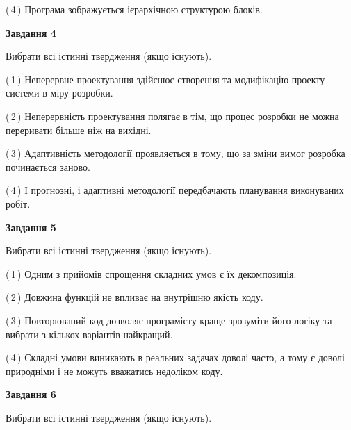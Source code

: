\documentclass[10pt, ukrainian]{article}
\begin{document}
{\begin {large}
(\,4\,) Програма зображується ієрархічною структурою блоків.%


{\begin {center}\textbf{Завдання 4}\end {center}}\par
Вибрати всі істинні твердження (якщо існують).\par
\vspace{2mm}



(\,1\,) Неперервне проектування здійснює створення та модифікацію проекту системи в міру розробки. %



(\,2\,) Неперервність проектування полягає в тім, що процес розробки не можна переривати більше ніж на вихідні. %



(\,3\,) Адаптивність методології проявляється в тому, що за зміни вимог розробка починається заново. %



(\,4\,) І прогнозні, і адаптивні методології передбачають планування виконуваних робіт. %


{\begin {center}\textbf{Завдання 5}\end {center}}\par
Вибрати всі істинні твердження (якщо існують).\par
\vspace{2mm}



(\,1\,) Одним з прийомів спрощення складних умов є їх декомпозиція. %



(\,2\,) Довжина функцій не впливає на внутрішню якість коду. %



(\,3\,) Повторюваний код дозволяє програмісту краще зрозуміти його логіку та вибрати з кількох варіантів найкращий. %



(\,4\,) Складні умови виникають в реальних задачах доволі часто, а тому є доволі природніми і не можуть вважатись недоліком коду. %

\newpage

{\begin {center}\textbf{Завдання 6}\end {center}}\par
Вибрати всі істинні твердження (якщо існують).\par
\vspace{2mm}




\end{large}}
\end{document}
